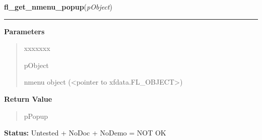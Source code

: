 \hspace{.8\funcindent}\begin{boxedminipage}{\funcwidth}

    \raggedright \textbf{fl\_get\_nmenu\_popup}(\textit{pObject})

    \vspace{-1.5ex}

    \rule{\textwidth}{0.5\fboxrule}
\setlength{\parskip}{2ex}
\setlength{\parskip}{1ex}
      \textbf{Parameters}
      \vspace{-1ex}

      \begin{quote}
        \begin{Ventry}{xxxxxxx}

          \item[pObject]

          nmenu object ({\textless}pointer to 
          xfdata.FL\_OBJECT{\textgreater})

        \end{Ventry}

      \end{quote}

      \textbf{Return Value}
    \vspace{-1ex}

      \begin{quote}
      pPopup

      \end{quote}

\textbf{Status:} Untested + NoDoc + NoDemo = NOT OK



    \end{boxedminipage}

    \label{xformslib:library:fl_set_nmenu_popup}

    \vspace{0.5ex}

